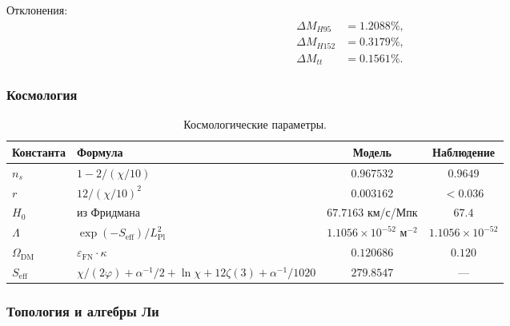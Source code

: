 \documentclass[11pt,a4paper]{article}
\theoremstyle{definition}
\begin{document}
\medskip\noindent
Отклонения:
\begin{align}
    \Delta M_{H95} &= 1.2088\%, \\
    \Delta M_{H152} &= 0.3179\%, \\
    \Delta M_{tt} &= 0.1561\%.
\end{align}

\subsubsection{Космология}

\begin{table}[ht]
\centering
\caption{Космологические параметры.}
\label{tab:app-cosmology}
\begin{tabular}{llcc}
\toprule
Константа & Формула & Модель & Наблюдение \\
\midrule
$n_s$ & $1 - 2/(\chi/10)$ & $0.967532$ & $0.9649$ \\
$r$ & $12/(\chi/10)^2$ & $0.003162$ & $< 0.036$ \\
$H_0$ & из Фридмана & $67.7163$ км/с/Мпк & $67.4$ \\
$\Lambda$ & $\exp(-S_{\text{eff}})/L_{\text{Pl}}^2$ & $1.1056 \times 10^{-52}$ м$^{-2}$ & $1.1056 \times 10^{-52}$ \\
$\Omega_{\text{DM}}$ & $\varepsilon_{\text{FN}} \cdot \kappa$ & $0.120686$ & $0.120$ \\
$S_{\text{eff}}$ & $\chi/(2\varphi) + \alpha^{-1}/2 + \ln\chi + 12\zeta(3) + \alpha^{-1}/1020$ & $279.8547$ & — \\
\bottomrule
\end{tabular}
\end{table}

\subsubsection{Топология и алгебры Ли}
\end{document}

